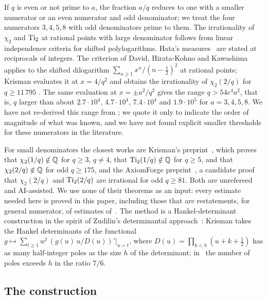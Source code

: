 If $q$ is even or not prime to $a$, the fraction $a/q$ reduces to one with a smaller numerator
or an even numerator and odd denominator; we treat the four numerators $3,4,5,8$ with odd
denominators prime to them. The irrationality of $\chi_2$ and $\operatorname{Ti}_2$ at rational points with
large denominator follows from linear independence criteria for shifted polylogarithms. Hata's
measures~\cite{Hata1990} are stated at reciprocals of integers. The criterion of David,
Hirata-Kohno and Kawashima~\cite{DHK2022Acta} applies to the shifted dilogarithm
$\sum_{n\ge1}x^n/(n-\frac12)^2$ at rational points; Krisman evaluates it at $x=4/q^2$ and
obtains the irrationality of $\chi_2(2/q)$ for $q\ge11\,795$ \cite[\S1.2]{Krisman2026chi2}.
The same evaluation at $x=\pm a^2/q^2$ gives the range $q>54e^4a^2$, that is, $q$ larger than
about $2.7\cdot10^4$, $4.7\cdot10^4$, $7.4\cdot10^4$ and $1.9\cdot10^5$ for $a=3,4,5,8$. We have not re-derived this range from
\cite{DHK2022Acta}; we quote it only to indicate the order of magnitude of what was known, and
we have not found explicit smaller thresholds for these numerators in the literature.

For small denominators the closest works are Krisman's preprint~\cite{Krisman2026chi2}, which
proves that $\chi_2(1/q)\notin\mathbb{Q}$ for $q\ge3$, $q\ne4$, that $\operatorname{Ti}_2(1/q)\notin\mathbb{Q}$ for $q\ge5$,
and that $\chi_2(2/q)\notin\mathbb{Q}$ for odd $q\ge175$, and the AxiomForge
preprint~\cite{AxiomForge2026numeratorTwo}, a candidate proof that $\chi_2(2/q)$ and
$\operatorname{Ti}_2(2/q)$ are irrational for odd $q\ge81$. Both are unrefereed and AI-assisted. We use none
of their theorems as an input: every estimate needed here is proved in this paper, including
those that are restatements, for general numerator, of estimates
of~\cite{AxiomForge2026numeratorTwo}. The method is a Hankel-determinant construction in the
spirit of Zudilin's determinantal approach~\cite{Zudilin2017}: Krisman takes the Hankel
determinants of the functional $g\mapsto\sum_{t\ge1}w^t\,(g(u)\,u/D(u))'|_{u=t}$, where
$D(u)=\prod_{k<h}(u+k+\frac12)$ has as many half-integer poles as the size $h$ of the
determinant; in~\cite{AxiomForge2026numeratorTwo} the number of poles exceeds $h$ in the ratio
$7/6$.

\subsection{The construction}\label{subsec:constructions}


